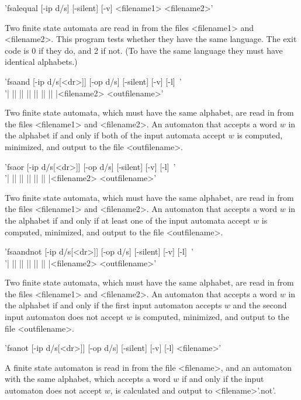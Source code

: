 'fsalequal [-ip d/s] [-silent] [-v] <filename1> <filename2>'

Two finite state automata are read in from the files <filename1> and
<filename2>. This program tests whether they have the same language.
The exit code is 0 if they do, and 2 if not.
(To have the same language they must have identical alphabets.)


'fsaand [-ip d/s[<dr>]] [-op d/s] [-silent] [-v] [-l]\
 <filename1>'\\
'| || || || || || || |<filename2> <outfilename>'

Two finite state automata, which must have the same alphabet,
are read in from the files <filename1> and <filename2>. An automaton that
accepts a word $w$ in the alphabet if and only if both of the input automata
accept $w$ is computed, minimized, and output to the file <outfilename>.


'fsaor [-ip d/s[<dr>]] [-op d/s] [-silent] [-v] [-l]\
 <filename1>'\\
'| || || || || || |<filename2> <outfilename>'

Two finite state automata, which must have the same alphabet, are read in from
the files <filename1> and <filename2>. An automaton that accepts a word $w$ in
the alphabet if and only if at least one of the input automata
accept $w$ is computed, minimized, and output to the file <outfilename>.

\Section{fsaandnot}

'fsaandnot [-ip d/s[<dr>]] [-op d/s] [-silent] [-v] [-l]\
 <filename1>'\\
'| || || || || || |<filename2> <outfilename>'

Two finite state automata, which must have the same alphabet, are read in from
the files <filename1> and <filename2>. An automaton that accepts a word $w$ in
the alphabet if and only if the first input automaton
accepts $w$ and the second input automaton does not accept $w$
is computed, minimized, and output to the file <outfilename>.

\Section{fsanot}

'fsanot [-ip d/s[<dr>]] [-op d/s] [-silent] [-v] [-l] <filename>'

A finite state automaton is read in from the file <filename>, and an automaton
with the same alphabet, which accepts a word $w$ if and only if the input
automaton does not accept $w$, is calculated and output to <filename>'.not'.

